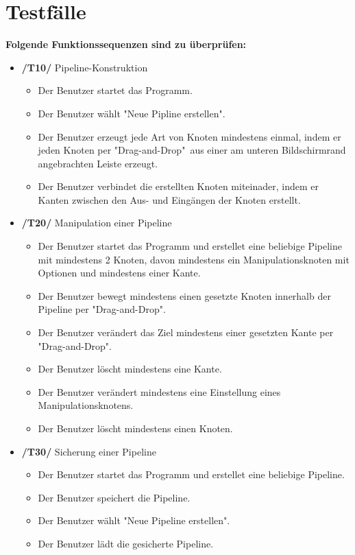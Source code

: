 \section{Testfälle}

\textbf{Folgende Funktionssequenzen sind zu überprüfen:}
\begin{itemize}
	\item\textbf{/T10/} Pipeline-Konstruktion
		\begin{itemize}
			\item Der Benutzer startet das Programm.
			\item Der Benutzer wählt "Neue Pipline erstellen".
			\item Der Benutzer erzeugt jede Art von Knoten mindestens einmal, indem er jeden Knoten per "Drag-and-Drop"\ aus einer am unteren Bildschirmrand
				angebrachten Leiste erzeugt.
			\item Der Benutzer verbindet die erstellten Knoten miteinader, indem er Kanten zwischen den Aus- und Eingängen der Knoten erstellt.
		\end{itemize}
	\item\textbf{/T20/} Manipulation einer Pipeline
		\begin{itemize}
			\item Der Benutzer startet das Programm und erstellet eine beliebige Pipeline mit mindestens 2 Knoten, davon mindestens ein Manipulationsknoten mit Optionen 
				und mindestens einer Kante.
			\item Der Benutzer bewegt mindestens einen gesetzte Knoten innerhalb der Pipeline per "Drag-and-Drop".
			\item Der Benutzer verändert das Ziel mindestens einer gesetzten Kante per "Drag-and-Drop".
			\item Der Benutzer löscht mindestens eine Kante.
			\item Der Benutzer verändert mindestens eine Einstellung eines Manipulationsknotens.
			\item Der Benutzer löscht mindestens einen Knoten.
		\end{itemize}
	\item\textbf{/T30/} Sicherung einer Pipeline
		\begin{itemize}
			\item Der Benutzer startet das Programm und erstellet eine beliebige Pipeline.
			\item Der Benutzer speichert die Pipeline.
			\item Der Benutzer wählt "Neue Pipeline erstellen".
			\item Der Benutzer lädt die gesicherte Pipeline.

\end{itemize}
\end{itemize}

